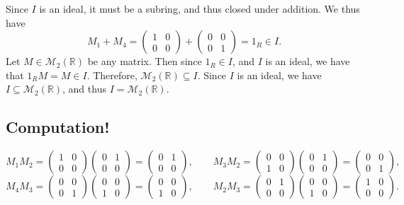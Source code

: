 \documentclass[11pt, letterpaper]{article}
\begin{document}
Since $I$ is an ideal, it must be a subring, and thus closed under addition. We thus have
\[
	M_1+M_4=\begin{pmatrix}
	1 & 0 \\
	0 & 0
	\end{pmatrix}+\begin{pmatrix}
	0 & 0 \\
	0 & 1
	\end{pmatrix}=1_R\in I
.\]
Let $M\in \mathcal{M}_2(\mathbb{R} )$ be any matrix. Then since $1_R\in I$, and $I$ is an ideal, we have that $1_RM=M\in I$. Therefore, $\mathcal{M}_2(\mathbb{R} )\subseteq I$. Since $I$ is an ideal, we have $I\subseteq \mathcal{M}_2(\mathbb{R} )$, and thus $I=\mathcal{M}_2(\mathbb{R} )$.

\subsection*{Computation!}
\[
	M_1M_2=\begin{pmatrix}
	1 & 0 \\
	0 & 0
	\end{pmatrix}\begin{pmatrix}
	0 & 1 \\
	0 & 0
	\end{pmatrix}=\begin{pmatrix}
	0 & 1 \\
	0 & 0
	\end{pmatrix},\qquad M_3M_2=\begin{pmatrix}
	0 & 0 \\
	1 & 0
	\end{pmatrix}\begin{pmatrix}
	0 & 1 \\
	0 & 0
	\end{pmatrix}=\begin{pmatrix}
	0 & 0 \\
	0 & 1
	\end{pmatrix},
\]
\[
	M_4M_3=\begin{pmatrix}
	0 & 0 \\
	0 & 1
	\end{pmatrix}\begin{pmatrix}
	0 & 0 \\
	1 & 0
	\end{pmatrix}=\begin{pmatrix}
	0 & 0 \\
	1 & 0
	\end{pmatrix},\qquad M_2M_3=\begin{pmatrix}
	0 & 1 \\
	0 & 0
	\end{pmatrix}\begin{pmatrix}
	0 & 0 \\
	1 & 0
	\end{pmatrix}=\begin{pmatrix}
	1 & 0 \\
	0 & 0
	\end{pmatrix}
.\]
\end{document}

